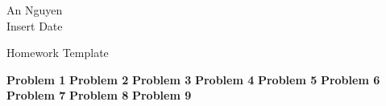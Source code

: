 \documentclass[12pt,oneside]{article}
\newenvironment{exercise}[1]{\vspace{.5cm}\noindent\textbf{#1 \hspace{.05em}}}{}
\begin{document}
\setlength{\belowdisplayskip}{5pt} \setlength{\belowdisplayshortskip}{0pt}
\setlength{\abovedisplayskip}{-10pt} \setlength{\abovedisplayshortskip}{0pt}

\begin{flushright}
An Nguyen\\
Insert Date\\
\end{flushright}

\begin{center}
Homework Template\\
\end{center}


\begin{exercise}{Problem 1}
\end{exercise}
\begin{exercise}{Problem 2}
\end{exercise}
\begin{exercise}{Problem 3}
\end{exercise}
\begin{exercise}{Problem 4}
\end{exercise}
\begin{exercise}{Problem 5}
\end{exercise}
\begin{exercise}{Problem 6}
\end{exercise}
\begin{exercise}{Problem 7}
\end{exercise}
\begin{exercise}{Problem 8}
\end{exercise}
\begin{exercise}{Problem 9}
\end{exercise}
\begin{flushleft}



\end{flushleft} 



\end{document}
